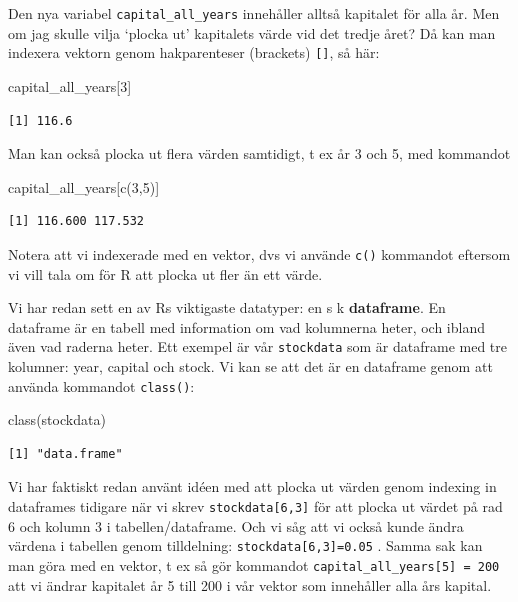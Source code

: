 \documentclass[
  letterpaper,
  DIV=11,
  numbers=noendperiod,
  oneside]{scrartcl}
\newenvironment{Shaded}{\begin{snugshade}}{\end{snugshade}}
\newcommand{\DecValTok}[1]{\textcolor[rgb]{0.68,0.00,0.00}{#1}}
\newcommand{\FunctionTok}[1]{\textcolor[rgb]{0.28,0.35,0.67}{#1}}
\newcommand{\NormalTok}[1]{\textcolor[rgb]{0.00,0.23,0.31}{#1}}
\begin{document}
Den nya variabel \texttt{capital\_all\_years} innehåller alltså
kapitalet för alla år. Men om jag skulle vilja `plocka ut' kapitalets
värde vid det tredje året? Då kan man indexera vektorn genom
hakparenteser (brackets) \texttt{{[}{]}}, så här:

\begin{Shaded}
\begin{Highlighting}[]
\NormalTok{capital\_all\_years[}\DecValTok{3}\NormalTok{]}
\end{Highlighting}
\end{Shaded}

\begin{verbatim}
[1] 116.6
\end{verbatim}

Man kan också plocka ut flera värden samtidigt, t ex år 3 och 5, med
kommandot

\begin{Shaded}
\begin{Highlighting}[]
\NormalTok{capital\_all\_years[}\FunctionTok{c}\NormalTok{(}\DecValTok{3}\NormalTok{,}\DecValTok{5}\NormalTok{)]}
\end{Highlighting}
\end{Shaded}

\begin{verbatim}
[1] 116.600 117.532
\end{verbatim}

Notera att vi indexerade med en vektor, dvs vi använde \texttt{c()}
kommandot eftersom vi vill tala om för R att plocka ut fler än ett
värde.

Vi har redan sett en av Rs viktigaste datatyper: en s k
\textbf{dataframe}. En dataframe är en tabell med information om vad
kolumnerna heter, och ibland även vad raderna heter. Ett exempel är vår
\texttt{stockdata} som är dataframe med tre kolumner: year, capital och
stock. Vi kan se att det är en dataframe genom att använda kommandot
\texttt{class()}:

\begin{Shaded}
\begin{Highlighting}[]
\FunctionTok{class}\NormalTok{(stockdata)}
\end{Highlighting}
\end{Shaded}

\begin{verbatim}
[1] "data.frame"
\end{verbatim}

Vi har faktiskt redan använt idéen med att plocka ut värden genom
indexing in dataframes tidigare när vi skrev \texttt{stockdata{[}6,3{]}}
för att plocka ut värdet på rad 6 och kolumn 3 i tabellen/dataframe. Och
vi såg att vi också kunde ändra värdena i tabellen genom tilldelning:
\texttt{stockdata{[}6,3{]}=0.05} . Samma sak kan man göra med en vektor,
t ex så gör kommandot \texttt{capital\_all\_years{[}5{]}\ =\ 200} att vi
ändrar kapitalet år 5 till 200 i vår vektor som innehåller alla års
kapital.
\end{document}
